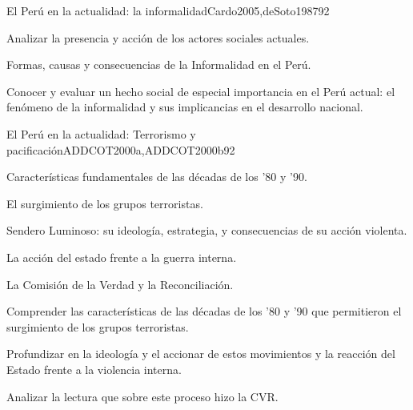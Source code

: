 \begin{syllabus}
\begin{unit}{El Perú en la actualidad: la informalidad}{Cardo2005,deSoto1987}{9}{2}
\begin{topics}
      \item Analizar la presencia y acción de los actores sociales actuales.
      \item Formas, causas y consecuencias de la Informalidad en el Perú.
\end{topics}

\begin{unitgoals}
      \item Conocer y evaluar un hecho social de especial importancia en el Perú actual: el fenómeno de la informalidad y sus implicancias en el desarrollo nacional.
\end{unitgoals}
\end{unit}

\begin{unit}{El Perú en la actualidad: Terrorismo y pacificación}{ADDCOT2000a,ADDCOT2000b}{9}{2}
\begin{topics}
      \item Características fundamentales de las décadas de los '80 y '90.
      \item El surgimiento de los grupos terroristas.
      \item Sendero Luminoso: su ideología, estrategia, y consecuencias de su acción violenta.
      \item La acción del estado frente a la guerra interna.
      \item La Comisión de la Verdad y la Reconciliación.
\end{topics}
\begin{unitgoals}
      \item Comprender las características de las décadas de los '80 y '90 que permitieron el surgimiento de los grupos terroristas.
      \item Profundizar en la ideología y el accionar de estos movimientos y la reacción del Estado frente a la violencia interna.
      \item Analizar la lectura que sobre este proceso hizo la CVR.
\end{unitgoals}
\end{unit}

\begin{coursebibliography}
\end{coursebibliography}

\end{syllabus}

%
